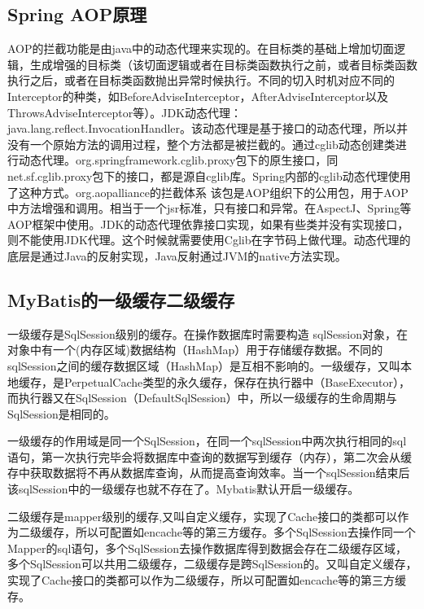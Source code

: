 \documentclass[../../../interview-questions.tex]{subfiles}
\begin{document}
\subsection{Spring AOP原理}

AOP的拦截功能是由java中的动态代理来实现的。在目标类的基础上增加切面逻辑，生成增强的目标类（该切面逻辑或者在目标类函数执行之前，或者目标类函数执行之后，或者在目标类函数抛出异常时候执行。不同的切入时机对应不同的Interceptor的种类，如BeforeAdviseInterceptor，AfterAdviseInterceptor以及ThrowsAdviseInterceptor等）。JDK动态代理：java.lang.reflect.InvocationHandler。该动态代理是基于接口的动态代理，所以并没有一个原始方法的调用过程，整个方法都是被拦截的。通过cglib动态创建类进行动态代理。org.springframework.cglib.proxy包下的原生接口，同net.sf.cglib.proxy包下的接口，都是源自cglib库。Spring内部的cglib动态代理使用了这种方式。org.aopalliance的拦截体系
该包是AOP组织下的公用包，用于AOP中方法增强和调用。相当于一个jsr标准，只有接口和异常。在AspectJ、Spring等AOP框架中使用。JDK的动态代理依靠接口实现，如果有些类并没有实现接口，则不能使用JDK代理。这个时候就需要使用Cglib在字节码上做代理。动态代理的底层是通过Java的反射实现，Java反射通过JVM的native方法实现。


\subsection{MyBatis的一级缓存二级缓存}

一级缓存是SqlSession级别的缓存。在操作数据库时需要构造 sqlSession对象，在对象中有一个(内存区域)数据结构（HashMap）用于存储缓存数据。不同的sqlSession之间的缓存数据区域（HashMap）是互相不影响的。一级缓存，又叫本地缓存，是PerpetualCache类型的永久缓存，保存在执行器中（BaseExecutor），而执行器又在SqlSession（DefaultSqlSession）中，所以一级缓存的生命周期与SqlSession是相同的。

一级缓存的作用域是同一个SqlSession，在同一个sqlSession中两次执行相同的sql语句，第一次执行完毕会将数据库中查询的数据写到缓存（内存），第二次会从缓存中获取数据将不再从数据库查询，从而提高查询效率。当一个sqlSession结束后该sqlSession中的一级缓存也就不存在了。Mybatis默认开启一级缓存。

二级缓存是mapper级别的缓存,又叫自定义缓存，实现了Cache接口的类都可以作为二级缓存，所以可配置如encache等的第三方缓存。多个SqlSession去操作同一个Mapper的sql语句，多个SqlSession去操作数据库得到数据会存在二级缓存区域，多个SqlSession可以共用二级缓存，二级缓存是跨SqlSession的。又叫自定义缓存，实现了Cache接口的类都可以作为二级缓存，所以可配置如encache等的第三方缓存。
\end{document}
